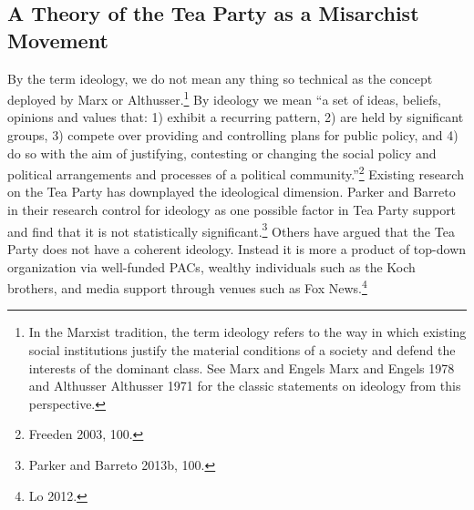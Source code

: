 \documentclass[12pt,]{article}
\begin{document}
\subsection{A Theory of the Tea Party as a Misarchist
Movement}\label{a-theory-of-the-tea-party-as-a-misarchist-movement}

By the term ideology, we do not mean any thing so technical as the
concept deployed by Marx or Althusser.\footnote{In the Marxist
  tradition, the term ideology refers to the way in which existing
  social institutions justify the material conditions of a society and
  defend the interests of the dominant class. See Marx and Engels Marx
  and Engels 1978 and Althusser Althusser 1971 for the classic
  statements on ideology from this perspective.} By ideology we mean ``a
set of ideas, beliefs, opinions and values that: 1) exhibit a recurring
pattern, 2) are held by significant groups, 3) compete over providing
and controlling plans for public policy, and 4) do so with the aim of
justifying, contesting or changing the social policy and political
arrangements and processes of a political community.''\footnote{Freeden
  2003, 100. } Existing research on the Tea Party has downplayed the
ideological dimension. Parker and Barreto in their research control for
ideology as one possible factor in Tea Party support and find that it is
not statistically significant.\footnote{Parker and Barreto 2013b, 100. }
Others have argued that the Tea Party does not have a coherent ideology.
Instead it is more a product of top-down organization via well-funded
PACs, wealthy individuals such as the Koch brothers, and media support
through venues such as Fox News.\footnote{Lo 2012. }
\end{document}
